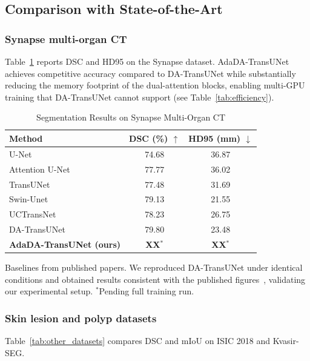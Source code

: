 \documentclass[conference]{IEEEtran}
\begin{document}
\subsection{Comparison with State-of-the-Art}

\subsubsection{Synapse multi-organ CT}
Table~\ref{tab:synapse} reports DSC and HD95 on the Synapse dataset. AdaDA-TransUNet achieves competitive accuracy compared to DA-TransUNet while substantially reducing the memory footprint of the dual-attention blocks, enabling multi-GPU training that DA-TransUNet cannot support (see Table~\ref{tab:efficiency}).

\begin{table}[t]
  \caption{Segmentation Results on Synapse Multi-Organ CT}
  \label{tab:synapse}
  \begin{center}
  \setlength{\tabcolsep}{4pt}
  \begin{tabular}{lcc}
    \toprule
    Method & DSC (\%) $\uparrow$ & HD95 (mm) $\downarrow$ \\
    \midrule
    U-Net~\cite{ronneberger2015unet}         & 74.68 & 36.87 \\
    Attention U-Net~\cite{oktay2018attention} & 77.77 & 36.02 \\
    TransUNet~\cite{chen2021transunet}        & 77.48 & 31.69 \\
    Swin-Unet~\cite{cao2022swinunet}          & 79.13 & 21.55 \\
    UCTransNet~\cite{wang2022uctransnet}      & 78.23 & 26.75 \\
    DA-TransUNet~\cite{sun2024datransunet}    & 79.80 & 23.48 \\
    \midrule
    \textbf{AdaDA-TransUNet (ours)}           & \textbf{XX}$^*$ & \textbf{XX}$^*$ \\
    \bottomrule
  \end{tabular}
  \end{center}
  \vspace{-0.4em}
  \footnotesize{Baselines from published papers. We reproduced DA-TransUNet under identical conditions and obtained results consistent with the published figures~\cite{sun2024datransunet}, validating our experimental setup. $^*$Pending full training run.}
\end{table}

\subsubsection{Skin lesion and polyp datasets}
Table~\ref{tab:other_datasets} compares DSC and mIoU on ISIC 2018 and Kvasir-SEG.
\end{document}
